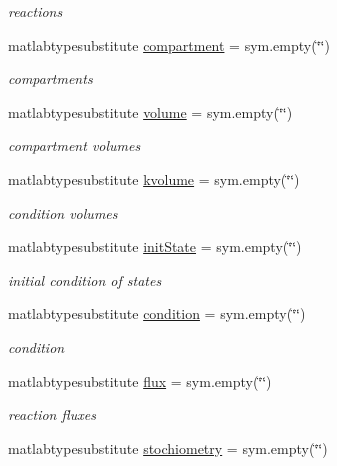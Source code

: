 \begin{DoxyCompactItemize}
\begin{DoxyCompactList}\small\item\em reactions \end{DoxyCompactList}\item 
matlabtypesubstitute \hyperlink{class_s_b_m_lode_a70729d905c114f8f08b3507f20806dd2}{compartment} = sym.\+empty(\char`\"{}\char`\"{})
\begin{DoxyCompactList}\small\item\em compartments \end{DoxyCompactList}\item 
matlabtypesubstitute \hyperlink{class_s_b_m_lode_a9bc498ccac8db41438f855f5dd3f4c05}{volume} = sym.\+empty(\char`\"{}\char`\"{})
\begin{DoxyCompactList}\small\item\em compartment volumes \end{DoxyCompactList}\item 
matlabtypesubstitute \hyperlink{class_s_b_m_lode_a9e15b899ae0b7804c80f96a342153934}{kvolume} = sym.\+empty(\char`\"{}\char`\"{})
\begin{DoxyCompactList}\small\item\em condition volumes \end{DoxyCompactList}\item 
matlabtypesubstitute \hyperlink{class_s_b_m_lode_a67d068407e71cba6ca16f3f6b6d1794c}{init\+State} = sym.\+empty(\char`\"{}\char`\"{})
\begin{DoxyCompactList}\small\item\em initial condition of states \end{DoxyCompactList}\item 
matlabtypesubstitute \hyperlink{class_s_b_m_lode_a4824b91cc0e6b5f112bdd8049af4d7d6}{condition} = sym.\+empty(\char`\"{}\char`\"{})
\begin{DoxyCompactList}\small\item\em condition \end{DoxyCompactList}\item 
matlabtypesubstitute \hyperlink{class_s_b_m_lode_a96d7a28b6a4428be15fc1017d19343fa}{flux} = sym.\+empty(\char`\"{}\char`\"{})
\begin{DoxyCompactList}\small\item\em reaction fluxes \end{DoxyCompactList}\item 
matlabtypesubstitute \hyperlink{class_s_b_m_lode_a8d6dd1568c43b32f1810a5fe9ef6100f}{stochiometry} = sym.\+empty(\char`\"{}\char`\"{})

\end{DoxyCompactItemize}
